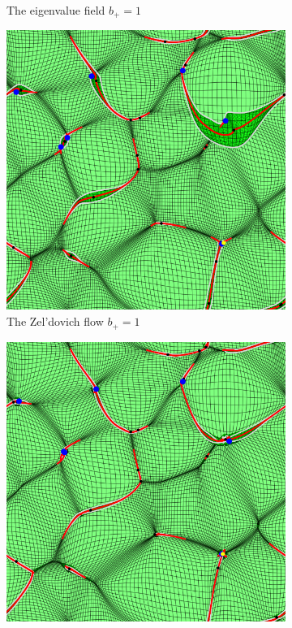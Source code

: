 \documentclass[a4paper, 11pt]{article}
\begin{document}
\begin{figure}
\begin{subfigure}[b]{0.32\textwidth}
\caption{The eigenvalue field $b_+=1$}
\label{fig:eigen1_1}
\end{subfigure}
\begin{subfigure}[b]{0.32\textwidth}
\includegraphics[width=\textwidth]{Visual_Zeldovich_D=1}
\caption{The Zel'dovich flow $b_+=1$}
\label{fig:Zeldovich_1}
\end{subfigure}
\begin{subfigure}[b]{0.32\textwidth}
\includegraphics[width=\textwidth]{Visual_Nbody_D=1}

\end{subfigure}
\end{figure}
\end{document}
